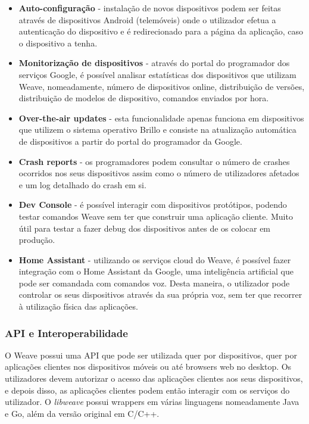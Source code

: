\begin{itemize}

\item \textbf{Auto-configuração} - instalação de novos dispositivos podem ser feitas através de dispositivos Android (telemóveis) onde o utilizador efetua a autenticação do dispositivo e é redirecionado para a página da aplicação, caso o dispositivo a tenha.

\item \textbf{Monitorização de dispositivos} - através do portal do programador dos serviços Google, é possível analisar estatísticas dos dispositivos que utilizam Weave, nomeadamente, número de dispositivos online, distribuição de versões, distribuição de modelos de dispositivo, comandos enviados por hora.

\item \textbf{Over-the-air updates} - esta funcionalidade apenas funciona em dispositivos que utilizem o sistema operativo Brillo e consiste na atualização automática de dispositivos a partir do portal do programador da Google.

\item \textbf{Crash reports} - os programadores podem consultar o número de crashes ocorridos nos seus dispositivos assim como o número de utilizadores afetados e um log detalhado do crash em si.

\item \textbf{Dev Console} - é possível interagir com dispositivos protótipos, podendo testar comandos Weave sem ter que construir uma aplicação cliente. Muito útil para testar a fazer debug dos dispositivos antes de os colocar em produção.

\item \textbf{Home Assistant} - utilizando os serviços cloud do Weave, é possível fazer integração com o Home Assistant da Google, uma inteligência artificial que pode ser comandada com comandos voz. Desta maneira, o utilizador pode controlar os seus dispositivos através da sua própria voz, sem ter que recorrer à utilização física das aplicações.
\end{itemize}


\subsubsection{API e Interoperabilidade}

O Weave possui uma API que pode ser utilizada quer por dispositivos, quer por aplicações clientes nos dispositivos móveis ou até browsers web no desktop. Os utilizadores devem autorizar o acesso das aplicações clientes aos seus dispositivos, e depois disso, as aplicações clientes podem então interagir com os serviços do utilizador. O \textit{libweave} possui wrappers em várias linguagens nomeadamente Java e Go, além da versão original em C/C++.

